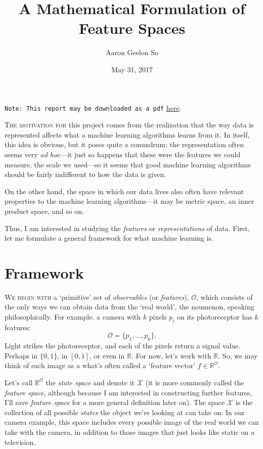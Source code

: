 \documentclass[10]{article}
\title{A Mathematical Formulation of Feature Spaces}
\author{Aaron Geelon So}
\date{May 31, 2017}
\providecommand{\bbR}{\mathbb{R}}
\theoremstyle{plain}
\begin{document}
\maketitle

\texttt{Note: This report may be downloaded as a pdf} \href{./files/ml_final_report.pdf}{here}.

\textsc{The motivation for} this project comes from the realization that the way data is represented affects what a machine learning algorithms learns from it. In itself, this idea is obvious, but it poses quite a conundrum: the representation often seems very \emph{ad hoc}---it just so happens that these were the features we could measure, the scale we used---so it seems that good machine learning algorithms should be fairly indifferent to how the data is given.

On the other hand, the space in which our data lives also often have relevant properties to the machine learning algorithms---it may be metric space, an inner product space, and so on.

Thus, I am interested in studying the \emph{features} or \emph{representations} of data. First, let me formulate a general framework for what machine learning is.

\section{Framework}
\textsc{We begin with} a `primitive' set of \emph{observables} (or \emph{features}), $\mathcal{O}$, which consists of the only ways we can obtain data from the `real world', the noumenon, speaking philosophically. For example, a camera with $k$ pixels $p_i$ on its photoreceptor has $k$ features:
\[\mathcal{O} = \{p_1,\dotsc, p_k\}.\]
Light strikes the photoreceptor, and each of the pixels return a signal value. Perhaps in $\{0,1\}$, in $[0,1]$, or even in $\bbR$. For now, let's work with $\bbR$. So, we may think of each image as a what's often called a `feature vector' $f \in \bbR^\mathcal{O}$.

Let's call $\bbR^\mathcal{O}$ the \emph{state space} and denote it $\mathcal{X}$ (it is more commonly called the \emph{feature space}, although because I am interested in constructing further features, I'll save \emph{feature space} for a more general definition later on). The space $\mathcal{X}$ is the collection of all possible \emph{states} the object we're looking at can take on. In our camera example, this space includes every possible image of the real world we can take with the camera, in addition to those images that just looks like static on a television.
\end{document}

